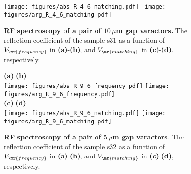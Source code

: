 \documentclass[10pt,a4paper,twoside]{article}
\begin{document}
\begin{multicols}{2}
\begin{figure*}[t]
  \\
  \texttt{[image: figures/abs\_R\_4\_6\_matching.pdf]}
  \texttt{[image: figures/arg\_R\_4\_6\_matching.pdf]} 
  \caption{\textbf{RF spectroscopy of a pair of $10\ \mu$m gap varactors.} The reflection coefficient of the sample s$31$ as a function of $V_{\mr{frequency}}$ in \textbf{(a)}-\textbf{(b)}, and $V_{\mr{matching}}$ in \textbf{(c)}-\textbf{(d)}, respectively.} 
  \label{fig_spectroscopy_plots_1}
\end{figure*}
\begin{figure*}[t]
  \centering
  \textbf{(a)} \hspace{10em} \textbf{(b)} 
  \\
  \texttt{[image: figures/abs\_R\_9\_6\_frequency.pdf]}
  \texttt{[image: figures/arg\_R\_9\_6\_frequency.pdf]} 
  \\
  \textbf{(c)} \hspace{10em} \textbf{(d)} 
  \\
  \texttt{[image: figures/abs\_R\_9\_6\_matching.pdf]}
  \texttt{[image: figures/arg\_R\_9\_6\_matching.pdf]} 
  \caption{\textbf{RF spectroscopy of a pair of $5\ \mu$m gap varactors.}  The reflection coefficient of the sample s$32$ as a function of $V_{\mr{frequency}}$ in \textbf{(a)}-\textbf{(b)}, and $V_{\mr{matching}}$ in \textbf{(c)}-\textbf{(d)}, respectively.} 
  \label{fig_spectroscopy_plots_2}
\end{figure*}

\end{multicols}
\end{document}

